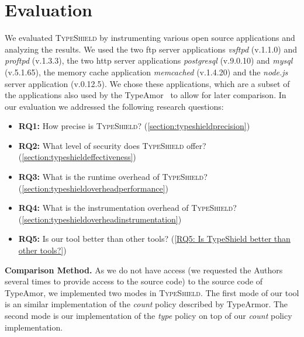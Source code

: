 \section{Evaluation}
\label{chapter:Evaluation}
We evaluated \textsc{TypeShield} by instrumenting various open source applications and analyzing the results. 
We used the two ftp server applications \textit{vsftpd} (v.1.1.0) and \textit{proftpd} (v.1.3.3), the two http server 
applications \textit{postgresql} (v.9.0.10) and \textit{mysql} (v.5.1.65), the memory cache application \textit{memcached} (v.1.4.20) 
and the \textit{node.js} server application (v.0.12.5). We chose these applications, which are a subset of the 
applications also used by the TypeAmor~\cite{veen:typearmor} to allow for later comparison.
In our evaluation we addressed the following research questions:
\begin{itemize}
 \item \textbf{RQ1:} How precise is \textsc{TypeShield}? (\cref{section:typeshieldprecision})

 \item \textbf{RQ2:} What level of security does \textsc{TypeShield} offer? (\cref{section:typeshieldeffectiveness})

 \item \textbf{RQ3:} What is the runtime overhead of \textsc{TypeShield}? (\cref{section:typeshieldoverheadperformance})

 \item \textbf{RQ4:} What is the instrumentation overhead of \textsc{TypeShield}? (\cref{section:typeshieldoverheadinstrumentation})

 \item \textbf{RQ5:} Is our tool better than other tools? (\cref{RQ5: Is TypeShield better than other tools?})
\end{itemize}
\textbf{Comparison Method.} As we do not have access (we requested the Authors several times to provide access to the source code) to the source code of TypeAmor, we implemented two modes in \textsc{TypeShield}. 
The first mode of our tool is an similar implementation of the \textit{count} 
policy described by TypeArmor. The second mode is our implementation of the \textit{type} policy on
top of our \textit{count} policy implementation. 
%

